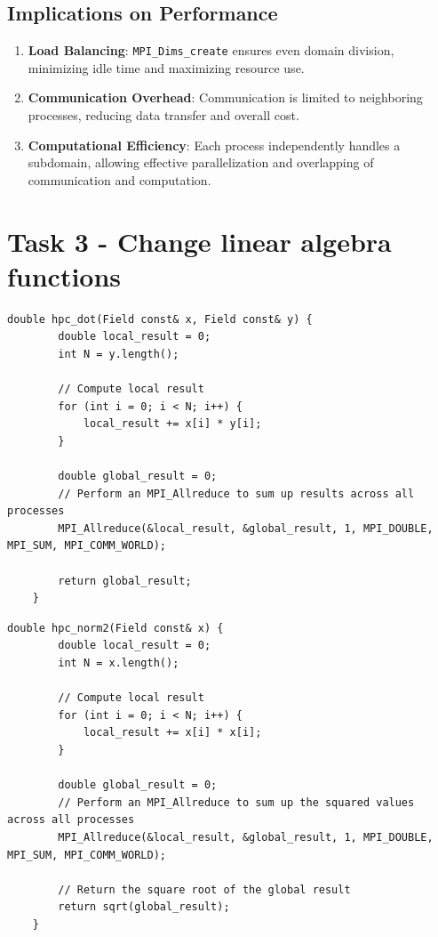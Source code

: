 \documentclass[unicode,11pt,a4paper,oneside,numbers=endperiod,openany]{scrartcl}
\begin{document}
\subsection{Implications on Performance}

\begin{enumerate}
    \item \textbf{Load Balancing}: \texttt{MPI\_Dims\_create} ensures even domain division, minimizing idle time and maximizing resource use.
    \item \textbf{Communication Overhead}: Communication is limited to neighboring processes, reducing data transfer and overall cost.
    \item \textbf{Computational Efficiency}: Each process independently handles a subdomain, allowing effective parallelization and overlapping of communication and computation.
\end{enumerate}


\section{Task 3 - Change linear algebra functions }

\begin{lstlisting}[style=mystyle, language=MyC++, caption={Implementation of \texttt{hpc\_dot} for Dot Product with MPI}]
    double hpc_dot(Field const& x, Field const& y) {
        double local_result = 0;
        int N = y.length();
    
        // Compute local result
        for (int i = 0; i < N; i++) {
            local_result += x[i] * y[i];
        }
    
        double global_result = 0;
        // Perform an MPI_Allreduce to sum up results across all processes
        MPI_Allreduce(&local_result, &global_result, 1, MPI_DOUBLE, MPI_SUM, MPI_COMM_WORLD);
    
        return global_result;
    }
\end{lstlisting}
    
\begin{lstlisting}[style=mystyle, language=MyC++, caption={Implementation of \texttt{hpc\_norm2} for 2-Norm Calculation with MPI}]
    double hpc_norm2(Field const& x) {
        double local_result = 0;
        int N = x.length();
    
        // Compute local result
        for (int i = 0; i < N; i++) {
            local_result += x[i] * x[i];
        }
    
        double global_result = 0;
        // Perform an MPI_Allreduce to sum up the squared values across all processes
        MPI_Allreduce(&local_result, &global_result, 1, MPI_DOUBLE, MPI_SUM, MPI_COMM_WORLD);
    
        // Return the square root of the global result
        return sqrt(global_result);
    }
\end{lstlisting}
\end{document}
